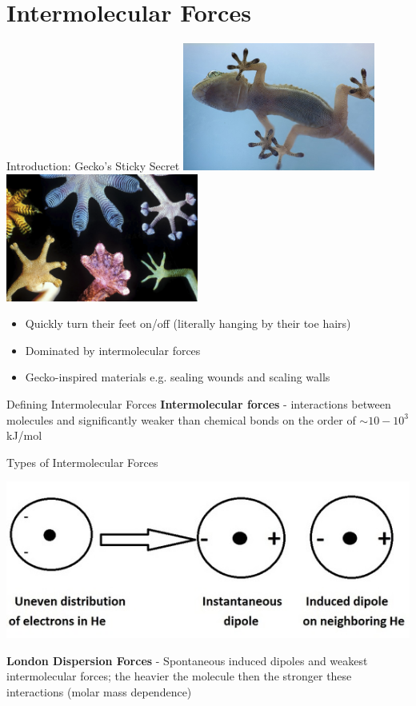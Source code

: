\documentclass[11pt]{beamer}
\begin{document}
\section{Intermolecular Forces}

\begin{frame}{Introduction: Gecko's Sticky Secret}
  \center
  \includegraphics[width=0.475\textwidth]{gecko-feet.jpg}
  \hfill
  \includegraphics[width=0.475\textwidth]{inspired_feet.png}
  \begin{itemize}
    \item Quickly turn their feet on/off (literally hanging by
      their toe hairs)
    \item Dominated by intermolecular forces
    \item Gecko-inspired materials e.g. sealing wounds and scaling
      walls
  \end{itemize}
\end{frame}

\begin{frame}{Defining Intermolecular Forces}
  \textbf{Intermolecular forces} - interactions between molecules
  and significantly weaker than chemical bonds on the order of
  $\sim 10 - 10^3$ kJ/mol
\end{frame}

\begin{frame}{Types of Intermolecular Forces}
  \begin{center}
    \includegraphics[scale=0.45]{disp.jpg}
  \end{center}
  \textbf{London Dispersion Forces} - Spontaneous induced dipoles
  and weakest intermolecular forces; the heavier the molecule then
  the stronger these interactions (molar mass dependence)
\end{frame}
\end{document}
